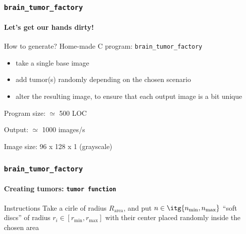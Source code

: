 \documentclass[]{beamer}
\newcommand{\btf}{\tt{brain\_tumor\_factory}}
\begin{document}
\begin{frame}
  \frametitle{\btf}
  \framesubtitle{Let's get our hands dirty!}
  \begin{block}{How to generate?}
    Home-made C program: \alert{\btf}
    \begin{itemize}
      \item take a \alert{single} base image
      \item add tumor(s) randomly depending on the chosen scenario
      \item alter the resulting image, to ensure that each output image is a bit unique
    \end{itemize}
    Program size: $\simeq$ 500 LOC

    Output: $\simeq$ 1000 images/s

    Image size: \alert{96 x 128 x 1} (grayscale)
  \end{block}
\end{frame}

\tikzfading[name=fade out, inner color=transparent!0,
  outer color=transparent!100]

\begin{frame}[fragile]
  \frametitle{\btf}
  \framesubtitle{Creating tumors: \tt{tumor} function}
  \begin{block}{Instructions}
    Take a cirle of radius $R_{\text{area}}$, and put $n \in \itg{n_{\text{min}}, n_{\text{max}}}$ ``soft discs'' of radius $r_i \in [r_{\text{min}}, r_{\text{max}}]$ with their center placed randomly inside the chosen area
  \end{block}
  \begin{center}
  \end{center}
\end{frame}
\end{document}
